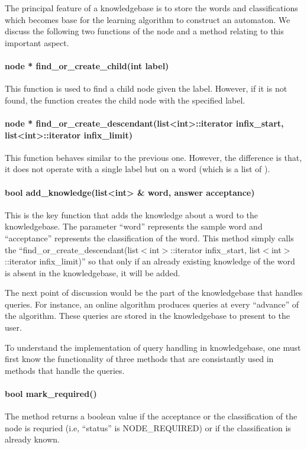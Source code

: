 The principal feature of a knowledgebase is to store the words and classifications which becomes base for the learning algorithm to construct an automaton. We discuss the following two functions of the node and a method relating to this important aspect.
\paragraph{node * find\_or\_create\_child(int label)}
	This function is used to find a child node given the label. However, if it is not found, the function creates the child node with the specified label.
	
\paragraph{node * find\_or\_create\_descendant(list<int>::iterator infix\_start, list<int>::iterator infix\_limit)} \hfill
	This function behaves similar to the previous one. However, the difference is that, it does not operate with a single label but on a word (which is a list of \integer). 
	
\paragraph{bool add\_knowledge(list<int> \& word, answer acceptance)} \hfill
	This is the key function that adds the knowledge about a word to the knowledgebase. The parameter ``word'' represents the sample word and ``acceptance'' represents the classification of the word. 
	This method simply calls the ``find\_or\_create\_descendant(list$<$int$>$::iterator infix\_start, list$<$int$>$::iterator infix\_limit)'' so that only if an already existing knowledge of the word is absent in the knowledgebase, it will be added.
	

The next point of discussion would be the part of the knowledgebase that handles queries. For instance, an online algorithm produces queries at every ``advance'' of the algorithm. These queries are stored in the knowledgebase to present to the user.

To understand the implementation of query handling in \libalf knowledgebase, one must first know the functionality of three methods that are consistantly used in methods that handle the queries.

\paragraph{bool mark\_required()} \hfill
	The method returns a boolean value \true if the acceptance or the classification of the node is requried (i.e, ``status'' is NODE\_REQUIRED) or \false if the classification is already known.
	
